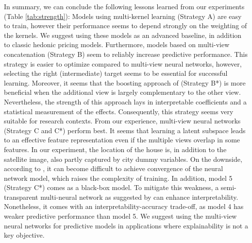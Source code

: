 \documentclass[letterpaper]{article}
\begin{document}
In summary, we can conclude the following lessons learned from our experiments (Table \ref{tab:strength}): Models using multi-kernel learning (Strategy A) are easy to train, however their performance seems to depend strongly on the weighting of the kernels. We suggest using these models as an advanced baseline, in addition to classic hedonic pricing models. Furthermore, models based on multi-view concatenation (Strategy B) seem to reliably increase predictive performance. This strategy is easier to optimize compared to multi-view neural networks, however, selecting the right (intermediate) target seems to be essential for successful learning. Moreover, it seems that the boosting approach of \citeauthor{naumzik2020one} \citeyearpar{naumzik2020one} (Strategy B*) is more beneficial when the additional view is largely complementary to the other view. Nevertheless, the strength of this approach lays in interpretable coefficients and a statistical measurement of the effects. Consequently, this strategy seems very suitable for research contexts. From our experience, multi-view neural networks (Strategy C and C*) perform best. It seems that learning a latent subspace leads to an effective feature representation even if the multiple views overlap in some features. In our experiment, the location of the house is, in addition to the satellite image, also partly captured by city dummy variables. On the downside, according to \citeauthor{bency2017beyond} \citeyearpar{bency2017beyond}, it can become difficult to achieve convergence of the neural network model, which raises the complexity of training. In addition, model 5 (Strategy C*) comes as a black-box model. To mitigate this weakness, a semi-transparent multi-neural network as suggested by \citeauthor{law2019take} \citeyearpar{law2019take} can enhance interpretability. Nonetheless, it comes with an interpretability-accuracy trade-off, as model 4 has weaker predictive performance than model 5. We suggest using the multi-view neural networks for predictive models in applications where explainability is not a key objective.
\end{document}
